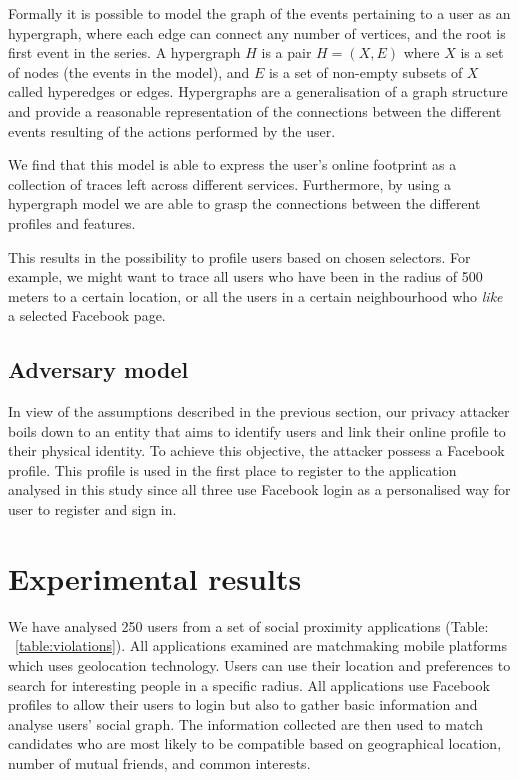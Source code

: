 Formally it is possible to model the graph of the events pertaining to a user as an hypergraph, where each edge can connect any number of vertices, and the root is first event in the series.  A hypergraph $H$ is a pair $H = (X,E)$ where $X$ is a set of nodes (the events in the model), and $E$ is a set of non-­empty subsets of $X$ called hyperedges or edges. Hypergraphs are a generalisation of a graph structure and provide a reasonable representation of the connections between the different events resulting of the actions performed by the user.

We find that this model is able to express the user's online footprint as a collection of traces left across different services. Furthermore, by using a hypergraph model we are able to grasp the connections between the different profiles and features.

This results in the possibility to profile users based on chosen selectors. For example, we might want to trace all users who have been in the radius of 500 meters to a certain location, or all the users in a certain neighbourhood who \emph{like} a selected Facebook page.

\subsection{Adversary model}

In view of the assumptions described in the previous section, our privacy attacker boils down to an entity that aims to identify users and link their online profile to their physical identity. To achieve this objective, the attacker possess a Facebook profile. This profile is used in the first place to register to the application analysed in this study since all three use Facebook login as a personalised way for user to register and sign in.

\section{Experimental results}
\label{sec:exp-results}
\noindent
We have analysed 250 users from a set of social proximity applications (Table: ~\ref{table:violations}). All applications examined are matchmaking mobile platforms which uses geolocation technology. Users can use their location and preferences to search for interesting people in a specific radius. All applications use Facebook profiles to allow their users to login but also to gather basic information and analyse users' social graph. The information collected are then used to match candidates who are most likely to be compatible based on geographical location, number of mutual friends, and common interests.

